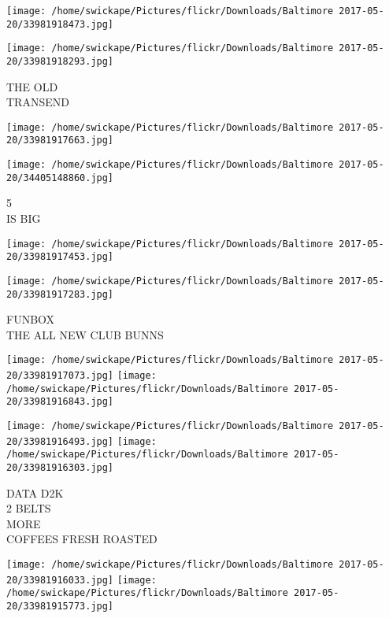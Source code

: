 \documentclass[10pt,letterpaper]{article}
\begin{document}
\texttt{[image: /home/swickape/Pictures/flickr/Downloads/Baltimore 2017-05-20/33981918473.jpg]}

\vspace{0.25in}
\texttt{[image: /home/swickape/Pictures/flickr/Downloads/Baltimore 2017-05-20/33981918293.jpg]}

THE OLD\\
TRANSEND\\
\pagebreak

\texttt{[image: /home/swickape/Pictures/flickr/Downloads/Baltimore 2017-05-20/33981917663.jpg]}

\vspace{0.25in}
\texttt{[image: /home/swickape/Pictures/flickr/Downloads/Baltimore 2017-05-20/34405148860.jpg]}

5\\
IS BIG\\
\pagebreak

\texttt{[image: /home/swickape/Pictures/flickr/Downloads/Baltimore 2017-05-20/33981917453.jpg]}

\vspace{0.25in}
\texttt{[image: /home/swickape/Pictures/flickr/Downloads/Baltimore 2017-05-20/33981917283.jpg]}

FUNBOX\\
THE ALL NEW CLUB BUNNS\\
\pagebreak

\texttt{[image: /home/swickape/Pictures/flickr/Downloads/Baltimore 2017-05-20/33981917073.jpg]}
\texttt{[image: /home/swickape/Pictures/flickr/Downloads/Baltimore 2017-05-20/33981916843.jpg]}

\texttt{[image: /home/swickape/Pictures/flickr/Downloads/Baltimore 2017-05-20/33981916493.jpg]}
\texttt{[image: /home/swickape/Pictures/flickr/Downloads/Baltimore 2017-05-20/33981916303.jpg]}

DATA D2K\\
2 BELTS\\
MORE\\
COFFEES FRESH ROASTED\\
\pagebreak

\texttt{[image: /home/swickape/Pictures/flickr/Downloads/Baltimore 2017-05-20/33981916033.jpg]}
\texttt{[image: /home/swickape/Pictures/flickr/Downloads/Baltimore 2017-05-20/33981915773.jpg]}
\end{document}
